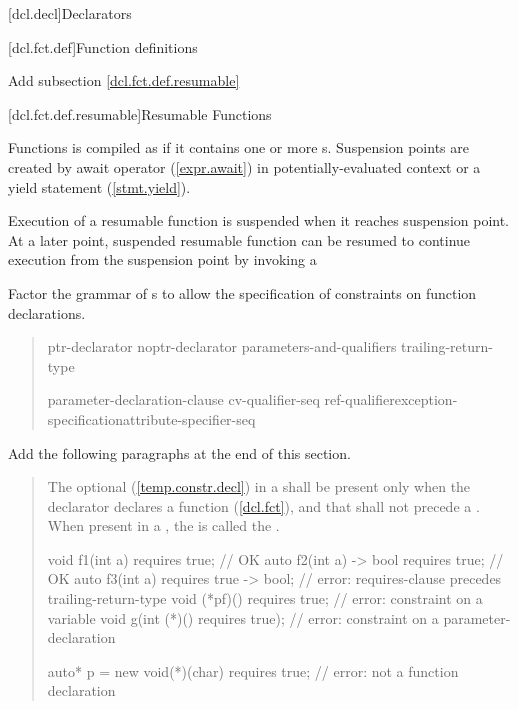 
[dcl.decl]{Declarators}

\setcounter{section}{3}
[dcl.fct.def]{Function definitions}

Add subsection \ref{dcl.fct.def.resumable}

\setcounter{subsection}{3}
[dcl.fct.def.resumable]{Resumable Functions}

\pnum
Functions is compiled as  if it contains
one or more s. 
Suspension points are created by await operator (\ref{expr.await}) in potentially-evaluated context
or a yield statement (\ref{stmt.yield}). 

\pnum
Execution of a resumable function is suspended when it reaches suspension point.
At a later point, suspended resumable function can be resumed
to continue execution from the suspension point by invoking
a 

Factor the grammar of s to
allow the specification of constraints on function declarations.

\begin{quote}
\setcounter{Paras}{3}


\begin{bnf}
\br
    ptr-declarator\br
    noptr-declarator parameters-and-qualifiers trailing-return-type 


\br
  \terminal{(} parameter-declaration-clause \terminal{)} cv-qualifier-seq\opt\br
    \hspace*{\bnfindentinc}ref-qualifier\opt exception-specification\opt attribute-specifier-seq\opt {}\opt
\end{bnf}
\end{quote}


Add the following paragraphs at the end of this section.

\begin{quote}
\pnum
The optional  (\ref{temp.constr.decl}) in a 
 shall be present only when the declarator declares a 
function (\ref{dcl.fct}), and that  shall not 
precede a . 
% 
When present in a , the  
is called the .
% 
\enterexample
\begin{codeblock}
void f1(int a) requires true;         // OK
auto f2(int a) -> bool requires true; // OK
auto f3(int a) requires true -> bool; // error: requires-clause precedes trailing-return-type
void (*pf)() requires true;           // error: constraint on a variable
void g(int (*)() requires true);      // error: constraint on a parameter-declaration
  
auto* p = new void(*)(char) requires true; // error: not a function declaration
\end{codeblock}
\exitexample
\end{quote}


